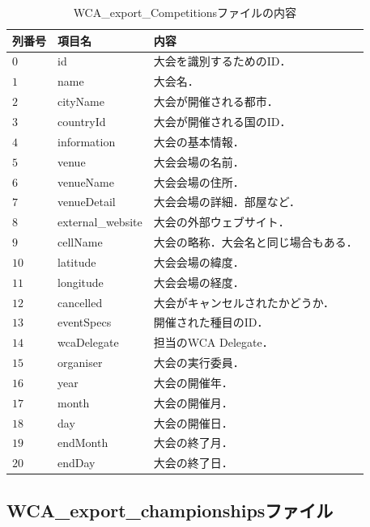 \documentclass{article}
\begin{document}
  \begin{table}[h]
    \centering
    \caption{WCA\_export\_Competitionsファイルの内容}
    \label{table:competitions}
    \begin{tabular}{l|l|l}
      \hline
      列番号 & 項目名 & 内容 \\
      \hline \hline
      $ 0 $ & id & 大会を識別するためのID． \\
      $ 1 $ & name & 大会名． \\
      $ 2 $ & cityName & 大会が開催される都市． \\
      $ 3 $ & countryId & 大会が開催される国のID． \\
      $ 4 $ & information & 大会の基本情報． \\
      $ 5 $ & venue & 大会会場の名前． \\
      $ 6 $ & venueName & 大会会場の住所． \\
      $ 7 $ & venueDetail & 大会会場の詳細．部屋など． \\
      $ 8 $ & external\_website & 大会の外部ウェブサイト． \\
      $ 9 $ & cellName & 大会の略称．大会名と同じ場合もある． \\
      $ 10 $ & latitude & 大会会場の緯度． \\
      $ 11 $ & longitude & 大会会場の経度． \\
      $ 12 $ & cancelled & 大会がキャンセルされたかどうか． \\
      $ 13 $ & eventSpecs & 開催された種目のID． \\
      $ 14 $ & wcaDelegate & 担当のWCA Delegate． \\
      $ 15 $ & organiser & 大会の実行委員． \\
      $ 16 $ & year & 大会の開催年． \\
      $ 17 $ & month & 大会の開催月． \\
      $ 18 $ & day & 大会の開催日． \\
      $ 19 $ & endMonth & 大会の終了月． \\
      $ 20 $ & endDay & 大会の終了日． \\
      \hline
    \end{tabular}
  \end{table}

  \subsection{WCA\_export\_championshipsファイル}
\end{document}
